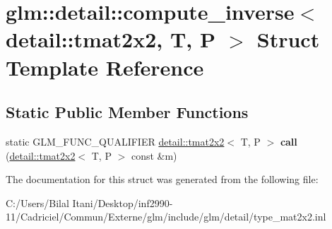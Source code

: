 \hypertarget{structglm_1_1detail_1_1compute__inverse_3_01detail_1_1tmat2x2_00_01_t_00_01_p_01_4}{}\section{glm\+:\+:detail\+:\+:compute\+\_\+inverse$<$ detail\+:\+:tmat2x2, T, P $>$ Struct Template Reference}
\label{structglm_1_1detail_1_1compute__inverse_3_01detail_1_1tmat2x2_00_01_t_00_01_p_01_4}
\subsection*{Static Public Member Functions}
\begin{DoxyCompactItemize}
\item 
static G\+L\+M\+\_\+\+F\+U\+N\+C\+\_\+\+Q\+U\+A\+L\+I\+F\+I\+ER \hyperlink{structglm_1_1detail_1_1tmat2x2}{detail\+::tmat2x2}$<$ T, P $>$ {\bfseries call} (\hyperlink{structglm_1_1detail_1_1tmat2x2}{detail\+::tmat2x2}$<$ T, P $>$ const \&m)\hypertarget{structglm_1_1detail_1_1compute__inverse_3_01detail_1_1tmat2x2_00_01_t_00_01_p_01_4_ab9c06b142ec7941cda76021e09240f30}{}\label{structglm_1_1detail_1_1compute__inverse_3_01detail_1_1tmat2x2_00_01_t_00_01_p_01_4_ab9c06b142ec7941cda76021e09240f30}

\end{DoxyCompactItemize}


The documentation for this struct was generated from the following file\+:\begin{DoxyCompactItemize}
\item 
C\+:/\+Users/\+Bilal Itani/\+Desktop/inf2990-\/11/\+Cadriciel/\+Commun/\+Externe/glm/include/glm/detail/type\+\_\+mat2x2.\+inl\end{DoxyCompactItemize}
